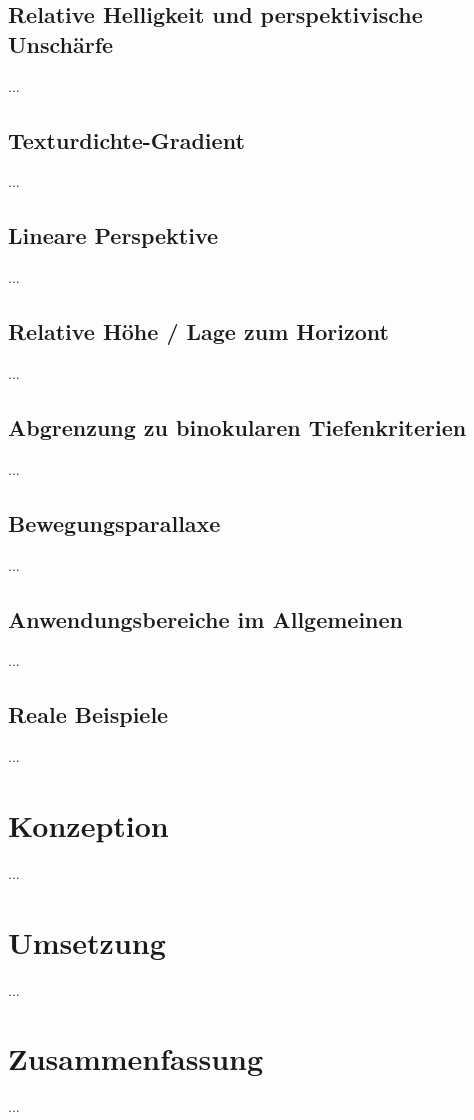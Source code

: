 \subsection{Relative Helligkeit und perspektivische Unschärfe}
...

\subsection{Texturdichte-Gradient}
...

\subsection{Lineare Perspektive}
...

\subsection{Relative Höhe / Lage zum Horizont}
...

\subsection{Abgrenzung zu binokularen Tiefenkriterien}
...

\subsection{Bewegungsparallaxe}
...

\subsection{Anwendungsbereiche im Allgemeinen}
...

\subsection{Reale Beispiele}
...

\section{Konzeption}
...

\section{Umsetzung}
...

\section{Zusammenfassung}
...
